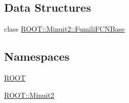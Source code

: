 \subsection*{Data Structures}
\begin{DoxyCompactItemize}
\item 
class \mbox{\hyperlink{classROOT_1_1Minuit2_1_1FumiliFCNBase}{R\+O\+O\+T\+::\+Minuit2\+::\+Fumili\+F\+C\+N\+Base}}
\end{DoxyCompactItemize}
\subsection*{Namespaces}
\begin{DoxyCompactItemize}
\item 
 \mbox{\hyperlink{namespaceROOT}{R\+O\+OT}}
\item 
 \mbox{\hyperlink{namespaceROOT_1_1Minuit2}{R\+O\+O\+T\+::\+Minuit2}}
\end{DoxyCompactItemize}
